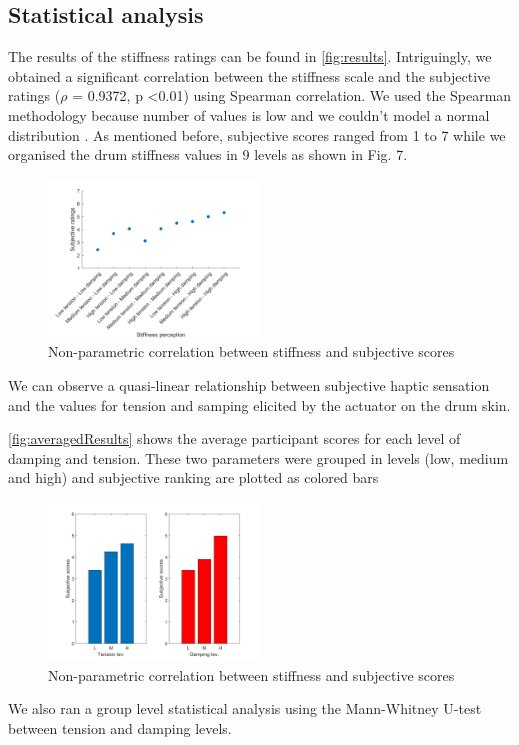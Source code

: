 \documentclass{vgtc}
\begin{document}
\subsection{Statistical analysis}
The results of the stiffness ratings can be found in \autoref{fig:results}. Intriguingly, we obtained a significant correlation between the stiffness scale and the subjective ratings ($\rho$ = 0.9372, p \textless 0.01) using Spearman correlation. We used the Spearman methodology because number of values is low and we couldn't model a normal distribution \cite{Kirk2007}. As mentioned before, subjective scores ranged from 1 to 7 while we organised the drum stiffness values in 9 levels as shown in Fig. 7.   
\begin{figure}[h]
\includegraphics[width=0.5\textwidth]{corr_anal}
\caption{Non-parametric correlation between stiffness and subjective scores}
\centering
\label{fig:results}
\end{figure} 
We can observe a quasi-linear relationship between subjective haptic sensation and the values for tension and samping elicited by the actuator on the drum skin. %

\autoref{fig:averagedResults} shows the average participant scores for each level of damping and tension. These two parameters were grouped in levels (low, medium and high) and subjective ranking are plotted as colored bars
\begin{figure}[h]
\includegraphics[width=0.5\textwidth]{tens_dump}
\caption{Non-parametric correlation between stiffness and subjective scores}
\centering
\label{fig:averagedResults}
\end{figure} 
We also ran a group level statistical analysis using the Mann-Whitney U-test between tension and damping levels.
\end{document}
